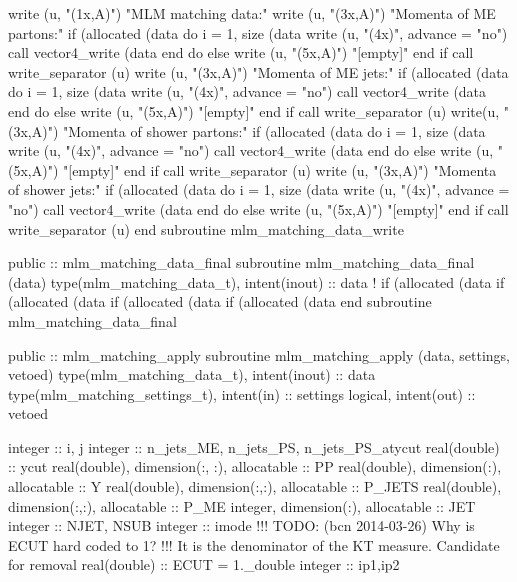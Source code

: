     write (u, "(1x,A)") "MLM matching data:"
    write (u, "(3x,A)") "Momenta of ME partons:"
    if (allocated (data%
       do i = 1, size (data%
          write (u, "(4x)", advance = "no")
          call vector4_write (data%
       end do
    else
       write (u, "(5x,A)")  "[empty]"
    end if
    call write_separator (u)
    write (u, "(3x,A)")  "Momenta of ME jets:"
    if (allocated (data%
       do i = 1, size (data%
          write (u, "(4x)", advance = "no")
          call vector4_write (data%
       end do
    else
       write (u, "(5x,A)")  "[empty]"
    end if
    call write_separator (u)
    write(u, "(3x,A)")  "Momenta of shower partons:"
    if (allocated (data%
       do i = 1, size (data%
          write (u, "(4x)", advance = "no")
          call vector4_write (data%
       end do
    else
       write (u, "(5x,A)")  "[empty]"
    end if
    call write_separator (u)
    write (u, "(3x,A)")  "Momenta of shower jets:"
    if (allocated (data%
       do i = 1, size (data%
          write (u, "(4x)", advance = "no")
          call vector4_write (data%
       end do
    else
       write (u, "(5x,A)")  "[empty]"
    end if
    call write_separator (u)
  end subroutine mlm_matching_data_write

\eatline
\nwendcode{}\nwdocspar
\nwenddocs{}\plusendmoddef
  public :: mlm_matching_data_final
\nwendcode{}\plusendmoddef
  subroutine mlm_matching_data_final (data)
    type(mlm_matching_data_t), intent(inout) :: data
    ! if (allocated (data%
    if (allocated (data%
    if (allocated (data%
    if (allocated (data%
  end subroutine mlm_matching_data_final

\eatline
\nwendcode{}\nwdocspar
\nwenddocs{}\plusendmoddef
  public :: mlm_matching_apply
\nwendcode{}\plusendmoddef
  subroutine mlm_matching_apply (data, settings, vetoed)
    type(mlm_matching_data_t), intent(inout) :: data
    type(mlm_matching_settings_t), intent(in) :: settings
    logical, intent(out) :: vetoed

    integer :: i, j
    integer :: n_jets_ME, n_jets_PS, n_jets_PS_atycut
    real(double) :: ycut
    real(double), dimension(:, :), allocatable :: PP
    real(double), dimension(:), allocatable :: Y
    real(double), dimension(:,:), allocatable :: P_JETS
    real(double), dimension(:,:), allocatable :: P_ME
    integer, dimension(:), allocatable :: JET
    integer :: NJET, NSUB
    integer :: imode
!!! TODO: (bcn 2014-03-26) Why is ECUT hard coded to 1?
!!! It is the denominator of the KT measure. Candidate for removal
    real(double) :: ECUT = 1._double
    integer :: ip1,ip2

